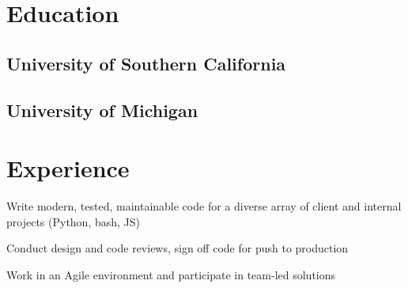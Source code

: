 \documentclass[]{deedy-resume-openfont}
\begin{document}
%
%
\lastupdated

%
%


%
%

\begin{minipage}[t]{0.99\textwidth} 

\section{Education}
\subsection{University of Southern California}
\sectionsep
\subsection{University of Michigan}
\sectionsep


\section{Experience}

\vspace{\topsep} %
\begin{tightemize}
\item Write modern, tested, maintainable code for a diverse array of client and internal projects (Python, bash, JS)
\item Conduct design and code reviews, sign off code for push to production 
\item Work in an Agile environment and participate in team-led solutions
\end{tightemize}
\sectionsep


\end{minipage}
\end{document}
